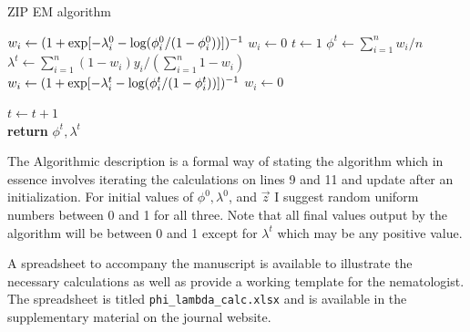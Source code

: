 \documentclass{article}
\begin{document}
\begin{algorithm}
\caption{ZIP EM algorithm}\label{alg:zip_em}
\begin{algorithmic}[1]
  		\State $w_i \gets (1+\exp[-\lambda_i^0 -\textnormal{log}(\phi_i^0/(1-\phi_i^0))])^{-1}$ 
	\Else 
  		\State $w_i \gets 0$ 
 	\EndIf
\EndFor
\State $t \gets 1$
\State $\phi^t \gets \sum_{i=1}^nw_i/n $\\
\State $\lambda^t \gets \sum_{i=1}^n(1-w_i)y_i /(\sum_{i=1}^n1-w_i) $\\
  		\State $w_i \gets (1+\exp[-\lambda_i^t -\textnormal{log}(\phi_i^t/(1-\phi_i^t))])^{-1}$ 
	\Else 
  		\State $w_i \gets 0$ 
 	\EndIf
\EndFor

\State $t\gets t+1$\\
\EndWhile
\State \textbf{return} $\phi^t, \lambda^t$\\
\EndProcedure
\end{algorithmic}
\end{algorithm}
The Algorithmic description is a formal way of stating the algorithm which in essence involves iterating the calculations on lines 9 and 11 and update after an initialization. For initial values of $\phi^0, \lambda^0$, and $\vec{z}$ I suggest random uniform numbers between 0 and 1 for all three. Note that all final values output by the algorithm will be between 0 and 1 except for $\lambda^t$ which may be any positive value. 

A spreadsheet to accompany the manuscript is available to illustrate the necessary calculations as well as provide a working template for the nematologist. The spreadsheet is titled \texttt{phi\_lambda\_calc.xlsx} and is available in the supplementary material on the journal website. 
\end{document}
